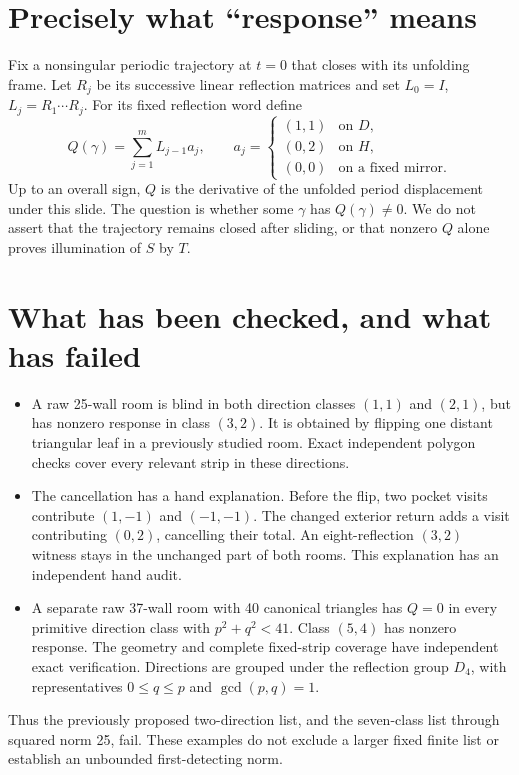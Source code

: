 \documentclass[11pt]{article}
\begin{document}
\section*{Precisely what ``response'' means}
Fix a nonsingular periodic trajectory at $t=0$ that closes with its unfolding frame. Let $R_j$ be its successive linear reflection matrices and set $L_0=I$, $L_j=R_1\cdots R_j$. For its fixed reflection word define
\[
 Q(\gamma)=\sum_{j=1}^m L_{j-1}a_j,\qquad
 a_j=\begin{cases}(1,1)&\text{on }D,\\(0,2)&\text{on }H,\\(0,0)&\text{on a fixed mirror.}\end{cases}
\]
Up to an overall sign, $Q$ is the derivative of the unfolded period displacement under this slide. The question is whether some $\gamma$ has $Q(\gamma)\ne0$. We do not assert that the trajectory remains closed after sliding, or that nonzero $Q$ alone proves illumination of $S$ by $T$.

\newpage
\section*{What has been checked, and what has failed}
\begin{itemize}
\item A raw 25-wall room is blind in both direction classes $(1,1)$ and $(2,1)$, but has nonzero response in class $(3,2)$. It is obtained by flipping one distant triangular leaf in a previously studied room. Exact independent polygon checks cover every relevant strip in these directions.
\item The cancellation has a hand explanation. Before the flip, two pocket visits contribute $(1,-1)$ and $(-1,-1)$. The changed exterior return adds a visit contributing $(0,2)$, cancelling their total. An eight-reflection $(3,2)$ witness stays in the unchanged part of both rooms. This explanation has an independent hand audit.
\item A separate raw 37-wall room with 40 canonical triangles has $Q=0$ in every primitive direction class with $p^2+q^2<41$. Class $(5,4)$ has nonzero response. The geometry and complete fixed-strip coverage have independent exact verification. Directions are grouped under the reflection group $D_4$, with representatives $0\le q\le p$ and $\gcd(p,q)=1$.
\end{itemize}
Thus the previously proposed two-direction list, and the seven-class list through squared norm 25, fail. These examples do not exclude a larger fixed finite list or establish an unbounded first-detecting norm.
\end{document}
